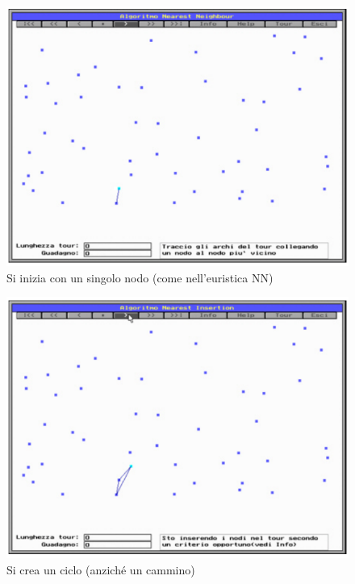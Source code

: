 \documentclass{article}
\begin{document}
    \begin{figure}[H]
        \centering
        \includegraphics[scale=0.5]{images/cheap_ins0.png}
        \caption{Si inizia con un singolo nodo (come nell'euristica NN)}
    \end{figure}

    \begin{figure}[H]
        \centering
        \includegraphics[scale=0.5]{images/cheap_ins1.png}
        \caption{Si crea un ciclo (anziché un cammino)}
    \end{figure}
\end{document}
